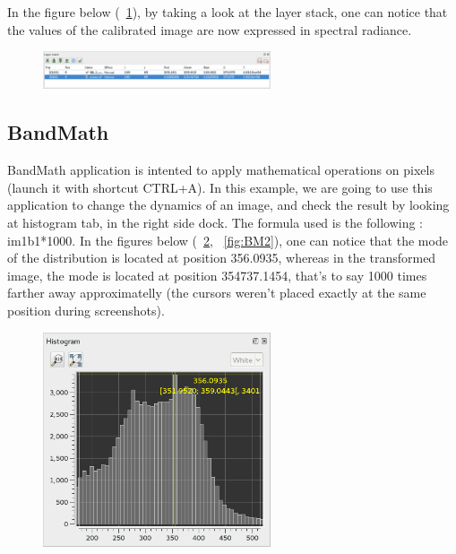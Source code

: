 In the figure below (~\ref{fig:OC}), by taking a look at the layer stack, one can notice that the values of the calibrated image are now expressed in spectral radiance.


\begin{figure}[!h] 
  \center
  \includegraphics[width=0.6\textwidth]{../Art/MonteverdiImages/OC.png}
  \label{fig:OC}
\end{figure}



\subsection{BandMath}\label{ssec:monbandmath}

BandMath application is intented to apply mathematical operations on pixels (launch it with shortcut CTRL+A). In this example, we are going to use this application to change the dynamics of an image,
and check the result by looking at histogram tab, in the right side dock. The formula used is the following : im1b1*1000.
In the figures below (~\ref{fig:BM1}, ~\ref{fig:BM2}), one can notice that the mode of the distribution is located at position 356.0935, whereas in the transformed image,
the mode is located at position 354737.1454, that's to say 1000 times farther away approximatelly (the cursors weren't placed exactly at the same position during screenshots).


\begin{figure}[!h] 
  \center
  \includegraphics[width=0.6\textwidth]{../Art/MonteverdiImages/BM1.png}
  \label{fig:BM1}
\end{figure}

